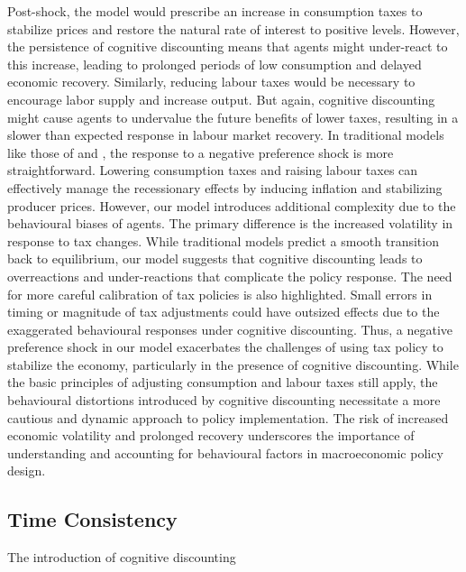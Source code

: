 \documentclass[11pt]{article}
\newcommand{\bb}{\bigbreak\noindent}
\begin{document}
\begin{spacing}{2}
\bb
Post-shock, the model would prescribe an increase in consumption taxes to stabilize prices and restore the natural rate of interest to positive levels. However, the persistence of cognitive discounting means that agents might under-react to this increase, leading to prolonged periods of low consumption and delayed economic recovery. Similarly, reducing labour taxes would be necessary to encourage labor supply and increase output. But again, cognitive discounting might cause agents to undervalue the future benefits of lower taxes, resulting in a slower than expected response in labour market recovery.
\bb
In traditional models like those of \cite{eggertsson2011fiscal} and \cite{correia2013unconventional}, the response to a negative preference shock is more straightforward. Lowering consumption taxes and raising labour taxes can effectively manage the recessionary effects by inducing inflation and stabilizing producer prices. However, our model introduces additional complexity due to the behavioural biases of agents. The primary difference is the increased volatility in response to tax changes. While traditional models predict a smooth transition back to equilibrium, our model suggests that cognitive discounting leads to overreactions and under-reactions that complicate the policy response. The need for more careful calibration of tax policies is also highlighted. Small errors in timing or magnitude of tax adjustments could have outsized effects due to the exaggerated behavioural responses under cognitive discounting. Thus, a negative preference shock in our model exacerbates the challenges of using tax policy to stabilize the economy, particularly in the presence of cognitive discounting. While the basic principles of adjusting consumption and labour taxes still apply, the behavioural distortions introduced by cognitive discounting necessitate a more cautious and dynamic approach to policy implementation. The risk of increased economic volatility and prolonged recovery underscores the importance of understanding and accounting for behavioural factors in macroeconomic policy design.



\subsection{Time Consistency}
The introduction of cognitive discounting





\end{spacing}
\end{document}

